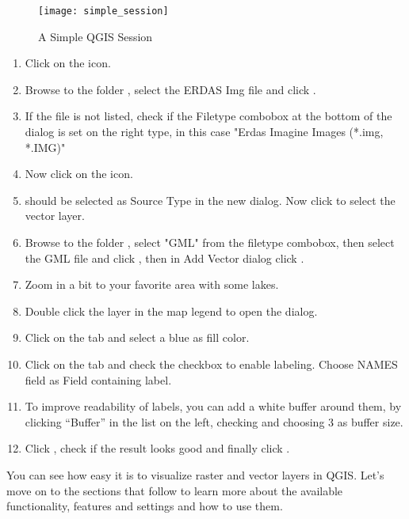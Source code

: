 \begin{figure}[ht]
   \begin{center}
   \caption{A Simple QGIS Session \nixcaption}\label{fig:simple_session}\smallskip
   \texttt{[image: simple\_session]}
\end{center}
\end{figure}


\begin{enumerate}
\item Click on the  icon.
\item Browse to the folder , select 
the ERDAS Img file  and click .
\item If the file is not listed, check if the Filetype combobox at the
bottom of the dialog is set on the right type, in this case "Erdas Imagine
Images (*.img, *.IMG)"
\item Now click on the  icon. 
\item {} should be selected as Source Type in the new
 dialog. Now click  to select the
vector layer.
\item Browse to the folder , select "GML"
from the filetype combobox, then select the GML file  
and click , then in Add Vector dialog click .
\item Zoom in a bit to your favorite area with some lakes.
\item Double click the  layer in the map legend to open the 
 dialog.
\item Click on the  tab and select a blue as fill color.
\item Click on the  tab and check the  
checkbox to enable labeling. Choose NAMES field as Field containing label.
\item To improve readability of labels, you can add a white buffer around them,
by clicking ``Buffer'' in the list on the left, checking  and choosing 3 as buffer size.
\item Click , check if the result looks good and finally
click .
\end{enumerate} 

You can see how easy it is to visualize raster and vector layers in 
QGIS. Let's move on to the sections that follow to learn more about the 
available functionality, features and settings and how to use them.
